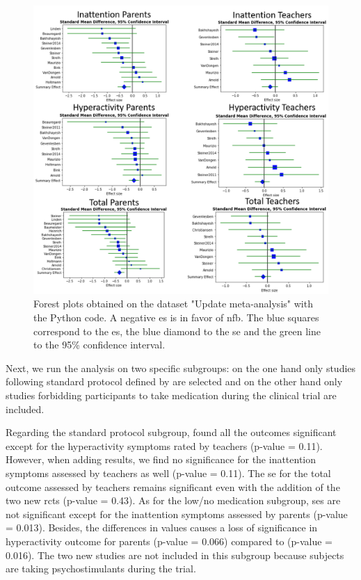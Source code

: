 \begin{figure}[h!]
  \centering
  \includegraphics[width=1.0\linewidth]{figures/meta_review_forest_plots_update_meta_analysis_our_choices_no_colors_2-columns_fitting_image}
  \caption{Forest plots obtained on the dataset "Update meta-analysis" with the Python code. A negative \gls{es} is in favor of \gls{nfb}. 
	The blue squares correspond to the \gls{es}, the blue diamond to the \gls{se} and the green line to the 95\% confidence interval.}
  \label{Figure:meta_review_forest_plots_update_meta_analysis_our_choices_no_colors_2-columns_fitting_image}
\end{figure}

Next, we run the analysis on two specific subgroups: on the one hand only studies following standard protocol defined by \citet{Arns2014}
are selected and on the other hand only studies forbidding participants to take medication during the clinical trial are included. 

Regarding the standard protocol subgroup, \citet{Cortese2016} found all the outcomes significant except for the hyperactivity symptoms 
rated by teachers (p-value = 0.11). However, when adding \citep{Strehl2017} results, we find no significance for the inattention symptoms assessed by 
teachers as well (p-value = 0.11). The \gls{se} for the total outcome assessed by teachers remains significant even with the addition of the two new
\glspl{rct} (p-value = 0.43).
As for the low/no medication subgroup, \glspl{se} are not significant except for the inattention symptoms assessed by parents (p-value = 0.013). 
Besides, the differences in \citet{Arnold2014} values causes a loss of significance in 
hyperactivity outcome for parents (p-value = 0.066) compared to \citet{Cortese2016} (p-value = 0.016). The two new studies are not 
included in this subgroup because subjects are taking psychostimulants during the trial.


